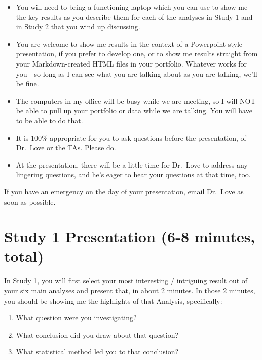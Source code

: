 \documentclass[]{book}
\providecommand{\tightlist}{%
  \setlength{\itemsep}{0pt}\setlength{\parskip}{0pt}}
\theoremstyle{definition}
\theoremstyle{definition}
\theoremstyle{definition}
\theoremstyle{remark}
\begin{document}
\begin{itemize}
\tightlist
\item
  You will need to bring a functioning laptop which you can use to show
  me the key results as you describe them for each of the analyses in
  Study 1 and in Study 2 that you wind up discussing.
\item
  You are welcome to show me results in the context of a
  Powerpoint-style presentation, if you prefer to develop one, or to
  show me results straight from your Markdown-created HTML files in your
  portfolio. Whatever works for you - so long as I can see what you are
  talking about as you are talking, we'll be fine.
\item
  The computers in my office will be busy while we are meeting, so I
  will NOT be able to pull up your portfolio or data while we are
  talking. You will have to be able to do that.
\item
  It is 100\% appropriate for you to ask questions before the
  presentation, of Dr.~Love or the TAs. Please do.
\item
  At the presentation, there will be a little time for Dr.~Love to
  address any lingering questions, and he's eager to hear your questions
  at that time, too.
\end{itemize}

If you have an emergency on the day of your presentation, email Dr.~Love
as soon as possible.

\hypertarget{study-1-presentation-6-8-minutes-total}{%
\section{Study 1 Presentation (6-8 minutes,
total)}\label{study-1-presentation-6-8-minutes-total}}

In Study 1, you will first select your most interesting / intriguing
result out of your six main analyses and present that, in about 2
minutes. In those 2 minutes, you should be showing me the highlights of
that Analysis, specifically:

\begin{enumerate}
\def\labelenumi{\alph{enumi}.}
\tightlist
\item
  What question were you investigating?
\item
  What conclusion did you draw about that question?
\item
  What statistical method led you to that conclusion?
\end{enumerate}
\end{document}
